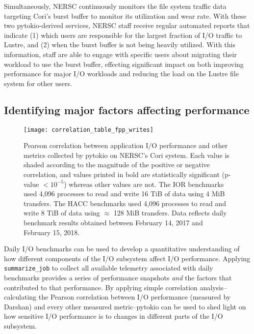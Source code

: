 Simultaneously, NERSC continuously monitors the file system traffic data targeting Cori's burst buffer to monitor its utilization and wear rate.
With these two pytokio-derived services, NERSC staff receive regular automated reports that indicate (1) which users are responsible for the largest fraction of I/O traffic to Lustre, and (2) when the burst buffer is not being heavily utilized.
With this information, staff are able to engage with specific users about migrating their workload to use the burst buffer, effecting significant impact on both improving performance for major I/O workloads and reducing the load on the Lustre file system for other users.

\subsection{Identifying major factors affecting performance} \label{sec:results/fs-behavior}

\begin{figure*}
    \centering
    \texttt{[image: correlation\_table\_fpp\_writes]}
    \caption{Pearson correlation between application I/O performance and other metrics collected by pytokio on NERSC's Cori system.
    Each value is shaded according to the magnitude of the positive or negative correlation, and values printed in bold are statistically significant (p-value $ < 10^{-5}$) whereas other values are not.
    The IOR benchmarks used 4,096 processes to read and write 16 TiB of data using 4 MiB transfers.
    The HACC benchmarks used 4,096 processes to read and write 8 TiB of data using $\approx$ 128 MiB transfers.
    Data reflects daily benchmark results obtained between February 14, 2017 and February 15, 2018.
    }
    \label{fig:correlation-table}
    \vspace{-.2in}
\end{figure*}

Daily I/O benchmarks can be used to develop a quantitative understanding of how different components of the I/O subsystem affect I/O performance.
Applying \texttt{summarize\_job} to collect all available telemetry associated with daily benchmarks provides a series of performance snapshots \emph{and} the factors that contributed to that performance.
By applying simple correlation analysis--calculating the Pearson correlation between I/O performance (measured by Darshan) and every other measured metric--pytokio can be used to shed light on how sensitive I/O performance is to changes in different parts of the I/O subsystem.

